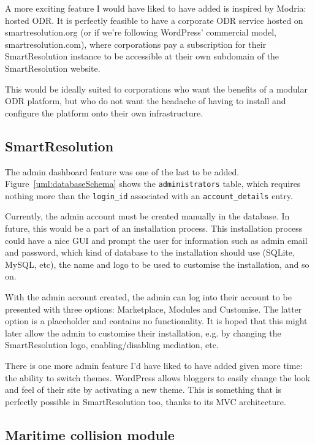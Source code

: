 A more exciting feature I would have liked to have added is inspired by Modria: hosted ODR. It is perfectly feasible to have a corporate ODR service hosted on smartresolution.org (or if we're following WordPress' commercial model, smartresolution.com), where corporations pay a subscription for their SmartResolution instance to be accessible at their own subdomain of the SmartResolution website.

This would be ideally suited to corporations who want the benefits of a modular ODR platform, but who do not want the headache of having to install and configure the platform onto their own infrastructure.

\subsection{SmartResolution}

The admin dashboard feature was one of the last to be added. Figure~\ref{uml:databaseSchema} shows the \lstinline{administrators} table, which requires nothing more than the \lstinline{login_id} associated with an \lstinline{account_details} entry.

Currently, the admin account must be created manually in the database. In future, this would be a part of an installation process. This installation process could have a nice GUI and prompt the user for information such as admin email and password, which kind of database to the installation should use (SQLite, MySQL, etc), the name and logo to be used to customise the installation, and so on.

With the admin account created, the admin can log into their account to be presented with three options: Marketplace, Modules and Customise. The latter option is a placeholder and contains no functionality. It is hoped that this might later allow the admin to customise their installation, e.g. by changing the SmartResolution logo, enabling/disabling mediation, etc.

There is one more admin feature I'd have liked to have added given more time: the ability to switch themes. WordPress allows bloggers to easily change the look and feel of their site by activating a new theme. This is something that is perfectly possible in SmartResolution too, thanks to its MVC architecture.

\subsection{Maritime collision module}

